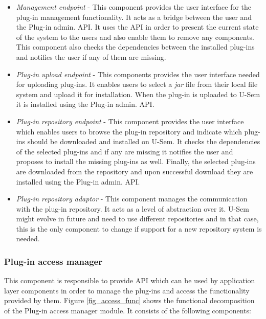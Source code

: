 \begin{itemize}

\item \textit{Management endpoint} - This component provides the user interface for the plug-in management functionality. It acts as a bridge between the user and the Plug-in admin. API. It uses the API in order to present the current state of the system to the users and also enable them to remove any components. This component also checks the dependencies between the installed plug-ins and notifies the user if any of them are missing.

\item \textit{Plug-in upload endpoint} - This components provides the user interface needed for uploading plug-ins. It enables users to select a \textit{jar} file from their local file system and upload it for installation. When the plug-in is uploaded to U-Sem it is installed using the Plug-in admin. API.

\item \textit{Plug-in repository endpoint} - This component provides the user interface which enables users to browse the plug-in repository and indicate which plug-ins should be downloaded and installed on U-Sem. It checks the dependencies of the selected plug-ins and if any are missing it notifies the user and proposes to install the missing plug-ins as well. Finally, the selected plug-ins are downloaded from the repository and upon successful download they are installed using the Plug-in admin. API.

\item \textit{Plug-in repository adaptor} - This component manages  the communication with the plug-in repository. It acts as a level of abstraction over it. U-Sem might evolve in future and need to use different repositories and in that case, this is the only component to change if support for a new repository system is needed. 

\end{itemize}


\subsubsection{Plug-in access manager}

This component is responsible to provide API which can be used by application layer components in order to manage the plug-ins and access the functionality provided by them. Figure \ref{fig_access_func} shows the functional decomposition of the Plug-in access manager module. It consists of the following components:


